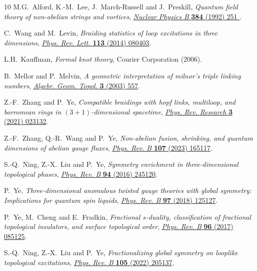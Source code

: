 \documentclass[11pt,nofootinbib,preprint]{revtex4-1}
\begin{document}
\begin{thebibliography}{10}
M.G.~Alford, K.-M.~Lee, J.~March-Russell and J.~Preskill, \emph{Quantum field
  theory of non-abelian strings and vortices},
  \href{https://doi.org/https://doi.org/10.1016/0550-3213(92)90468-Q}{\emph{Nuclear
  Physics B} {\bfseries 384} (1992) 251 }.

C.~Wang and M.~Levin, \emph{Braiding statistics of loop excitations in three
  dimensions},
  \href{https://doi.org/10.1103/PhysRevLett.113.080403}{\emph{Phys. Rev. Lett.}
  {\bfseries 113} (2014) 080403}.

L.H.~Kauffman, \emph{Formal knot theory}, Courier Corporation (2006).

B.~Mellor and P.~Melvin, \emph{A geometric interpretation of milnor's triple
  linking numbers}, \href{https://doi.org/10.2140/agt.2003.3.557}{\emph{Algebr.
  Geom. Topol.} {\bfseries 3} (2003) 557}.

Z.-F.~Zhang and P.~Ye, \emph{Compatible braidings with hopf links, multiloop,
  and borromean rings in $(3+1)$-dimensional spacetime},
  \href{https://doi.org/10.1103/PhysRevResearch.3.023132}{\emph{Phys. Rev.
  Research} {\bfseries 3} (2021) 023132}.

Z.-F.~Zhang, Q.-R.~Wang and P.~Ye, \emph{Non-abelian fusion, shrinking, and
  quantum dimensions of abelian gauge fluxes},
  \href{https://doi.org/10.1103/PhysRevB.107.165117}{\emph{Phys. Rev. B}
  {\bfseries 107} (2023) 165117}.

S.-Q.~Ning, Z.-X.~Liu and P.~Ye, \emph{Symmetry enrichment in three-dimensional
  topological phases},
  \href{https://doi.org/10.1103/PhysRevB.94.245120}{\emph{Phys. Rev. B}
  {\bfseries 94} (2016) 245120}.

P.~Ye, \emph{Three-dimensional anomalous twisted gauge theories with global
  symmetry: Implications for quantum spin liquids},
  \href{https://doi.org/10.1103/PhysRevB.97.125127}{\emph{Phys. Rev. B}
  {\bfseries 97} (2018) 125127}.

P.~Ye, M.~Cheng and E.~Fradkin, \emph{Fractional $s$-duality, classification of
  fractional topological insulators, and surface topological order},
  \href{https://doi.org/10.1103/PhysRevB.96.085125}{\emph{Phys. Rev. B}
  {\bfseries 96} (2017) 085125}.

S.-Q.~Ning, Z.-X.~Liu and P.~Ye, \emph{Fractionalizing global symmetry on
  looplike topological excitations},
  \href{https://doi.org/10.1103/PhysRevB.105.205137}{\emph{Phys. Rev. B}
  {\bfseries 105} (2022) 205137}.


\end{thebibliography}
\end{document}

